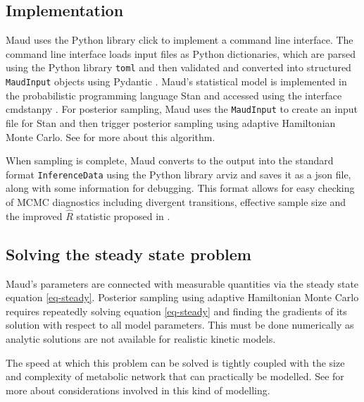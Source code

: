 \documentclass[journal=asbcd6,manuscript=article,layout=traditional]{achemso}
\begin{document}
\hypertarget{implementation}{%
\subsection{Implementation}\label{implementation}}

Maud uses the Python library click
\citep{clickdevelopersClickPythonComposable2022} to implement a command
line interface. The command line interface loads input files as Python
dictionaries, which are parsed using the Python library \texttt{toml}
\citep{pearsonTomlPythonLibrary2020} and then validated and converted
into structured \texttt{MaudInput} objects using Pydantic
\citep{pydanticdevelopersPydantic2022}. Maud's statistical model is
implemented in the probabilistic programming language Stan
\citep{carpenterStanProbabilisticProgramming2017} and accessed using the
interface cmdstanpy \citep{standevelopmentteamCmdStanPy2022}. For
posterior sampling, Maud uses the \texttt{MaudInput} to create an input
file for Stan and then trigger posterior sampling using adaptive
Hamiltonian Monte Carlo. See
\citet{betancourtConceptualIntroductionHamiltonian2018} for more about
this algorithm.

When sampling is complete, Maud converts to the output into the standard
format \texttt{InferenceData} using the Python library arviz
\citep{kumarArviZUnifiedLibrary2019} and saves it as a json file, along
with some information for debugging. This format allows for easy
checking of MCMC diagnostics including divergent transitions, effective
sample size and the improved \(\hat{R}\) statistic proposed in
\citet{vehtariRankNormalizationFoldingLocalization2021}.

\hypertarget{solving-the-steady-state-problem}{%
\subsection{Solving the steady state
problem}\label{solving-the-steady-state-problem}}

Maud's parameters are connected with measurable quantities via the
steady state equation \eqref{eq-steady}. Posterior sampling using
adaptive Hamiltonian Monte Carlo requires repeatedly solving equation
\eqref{eq-steady} and finding the gradients of its solution with respect
to all model parameters. This must be done numerically as analytic
solutions are not available for realistic kinetic models.

The speed at which this problem can be solved is tightly coupled with
the size and complexity of metabolic network that can practically be
modelled. See \citet{timonenImportanceSamplingApproach2022a} for more
about considerations involved in this kind of modelling.
\end{document}
